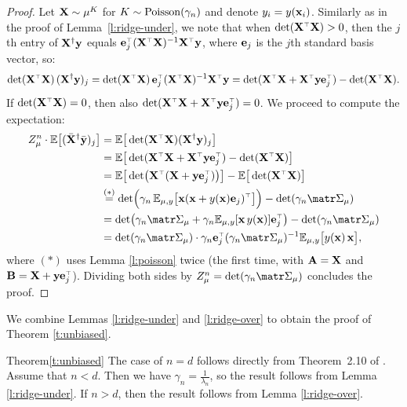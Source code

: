 \documentclass[../../thesis.tex]{subfiles}
\begin{document}
\begin{proof}
  Let $\mathbf X\sim\mu^K$ for $K\sim{\operatorname{Poisson}}(\gamma_n)$ and denote
  $y_i=y(\mathbf x_i)$. Similarly as in the proof of
  Lemma~\ref{l:ridge-under}, we note that when $\det(\X^\top\X)>0$,
  then
  the $j$th entry of $\mathbf X^\dagger\mathbf y$ equals
  $\e_j^\top(\X^\top\X)^{-1}\X^\top\y$, where $\mathbf e_j$ is the $j$th
  standard basis vector, so:
  \begin{align*}
    \det(\X^\top\X)\,(\X^\dagger\y)_j =
    \det(\X^\top\X)\, \e_j^\top(\X^\top\X)^{-1}\X^\top\y =
    \det(\X^\top\X+\X^\top\y\e_j^\top) - \det(\X^\top\X).
  \end{align*}
  If $\det(\X^\top\X)=0$, then also
  $\det(\X^\top\X+\X^\top\y\e_j^\top)=0$. We proceed to compute the
  expectation:
  \begin{align*}
    Z_\mu^n\cdot\E\big[(\Xb^\dagger\ybb)_j\big]
     & =  \E\big[\det(\X^\top\X)(\X^\dagger\y)_j\big]                                     \\
     & = \E\big[\det(\X^\top\X+\X^\top\y\e_j^\top)-\det(\X^\top\X)\big]                   \\
     & =\E\big[\det\!\big(\X^\top(\X+\y\e_j^\top)\big)\big] - \E\big[\det(\X^\top\X)\big] \\
     & \overset{(*)}{=}\det\!\Big(
    \gamma_n\,\E_{\mu,y}\big[\x(\x+ y(\x)\e_j)^\top\big]\Big)
    -\det(\gamma_n\Sigmab_\mu)                                                            \\
     & =\det\!\big(\gamma_n\Sigmab_\mu + \gamma_n\E_{\mu,y}[\x\,y(\x)]\e_j^\top\big)
    -\det(\gamma_n\Sigmab_\mu)                                                            \\
     & =\det(\gamma_n\Sigmab_\mu)\cdot
    \gamma_n\e_j^\top(\gamma_n\Sigmab_\mu)^{-1}\E_{\mu,y}\big[y(\x)\,\x\big],
  \end{align*}
  where $(*)$ uses Lemma \ref{l:poisson} twice (the first time, with
  $\mathbf A=\mathbf X$ and $\B=\X+\y\e_j^\top$). Dividing both sides by
  $Z_\mu^n=\det(\gamma_n\Sigmab_\mu)$ concludes the proof.
\end{proof}

\noindent
We combine Lemmas \ref{l:ridge-under} and \ref{l:ridge-over} to obtain
the proof of Theorem \ref{t:unbiased}.
\begin{proofof}{Theorem}{\ref{t:unbiased}}
  The case of $n=d$ follows directly from Theorem~2.10 of
  \cite{correcting-bias}.
  Assume that $n<d$. Then we have
  $\gamma_n=\frac1{\lambda_n}$, so the result follows
  from Lemma \ref{l:ridge-under}.
  If $n>d$, then the result follows from Lemma \ref{l:ridge-over}.
\end{proofof}
\end{document}

